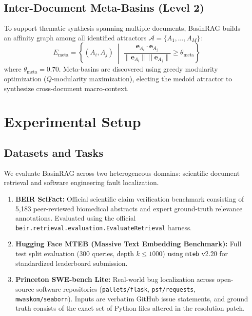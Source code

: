 \documentclass[10pt,twocolumn]{article}
\theoremstyle{definition}
\begin{document}
\subsection{Inter-Document Meta-Basins (Level 2)}

To support thematic synthesis spanning multiple documents, BasinRAG builds an affinity graph among all identified attractors $\mathcal{A} = \{A_1, \dots, A_M\}$:
\begin{equation}
E_{\text{meta}} = \left\{ (A_i, A_j) \;\middle|\; \frac{\mathbf{e}_{A_i} \cdot \mathbf{e}_{A_j}}{\|\mathbf{e}_{A_i}\| \|\mathbf{e}_{A_j}\|} \ge \theta_{\text{meta}} \right\}
\end{equation}
where $\theta_{\text{meta}} = 0.70$. Meta-basins are discovered using greedy modularity optimization ($Q$-modularity maximization), electing the medoid attractor to synthesize cross-document macro-context.

\section{Experimental Setup}

\subsection{Datasets and Tasks}

We evaluate BasinRAG across two heterogeneous domains: scientific document retrieval and software engineering fault localization.

\begin{enumerate}
    \item \textbf{BEIR SciFact:} Official scientific claim verification benchmark consisting of 5,183 peer-reviewed biomedical abstracts and expert ground-truth relevance annotations. Evaluated using the official \texttt{beir.retrieval.evaluation.EvaluateRetrieval} harness.
    \item \textbf{Hugging Face MTEB (Massive Text Embedding Benchmark):} Full test split evaluation (300 queries, depth $k \le 1000$) using \texttt{mteb} v2.20 for standardized leaderboard submission.
    \item \textbf{Princeton SWE-bench Lite:} Real-world bug localization across open-source software repositories (\texttt{pallets/flask}, \texttt{psf/requests}, \texttt{mwaskom/seaborn}). Inputs are verbatim GitHub issue statements, and ground truth consists of the exact set of Python files altered in the resolution patch.
\end{enumerate}
\end{document}
